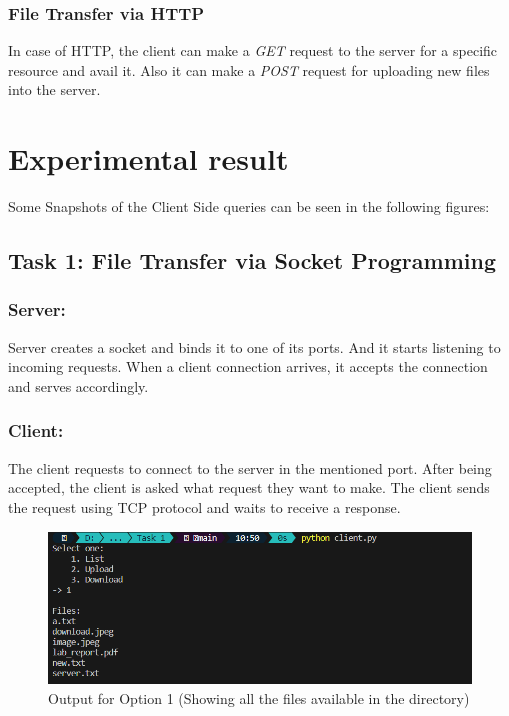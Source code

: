 \documentclass[11pt]{article}
\begin{document}
\subsubsection{File Transfer via HTTP}
In case of HTTP, the client can make a \emph{GET} request to the server for a specific resource and avail it. Also it can make a \emph{POST} request for uploading new files into the server.

\section{Experimental result}

Some Snapshots of the Client Side queries can be seen in the following figures:

\subsection{Task 1: File Transfer via Socket Programming}

\subsubsection{Server:}

Server creates a socket and binds it to one of its ports. And it starts listening to incoming requests. When a client connection arrives, it accepts the connection and serves accordingly.

\subsubsection{Client: }

The client requests to connect to the server in the mentioned port. After being accepted, the client is asked what request they want to make. The client sends the request using TCP protocol and waits to receive a response.

\begin{figure}[H]
    \centering
    \includegraphics[scale=0.7]{Task 1/list.png} 
    \caption{Output for Option 1 (Showing all the files available in the directory)}
    \label{fig: Output for Option 1}
\end{figure}
\end{document}
